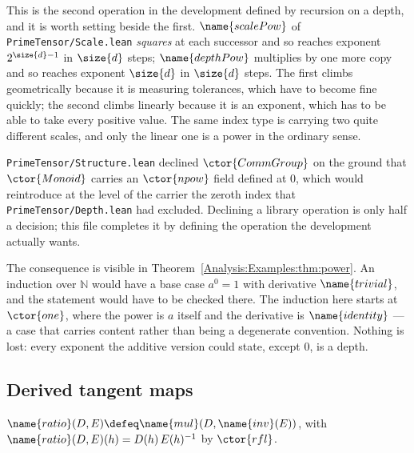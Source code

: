 \begin{remark}
\label{Analysis:Examples:rem:two-iterations}
This is the second operation in the development defined by recursion on a
depth, and it is worth setting beside the first.  $\name{scalePow}$ of
\texttt{PrimeTensor/Scale.lean} \emph{squares} at each successor and so reaches
exponent $2^{\size{d}-1}$ in $\size{d}$ steps; $\name{depthPow}$ multiplies by
one more copy and so reaches exponent $\size{d}$ in $\size{d}$ steps.  The
first climbs geometrically because it is measuring tolerances, which have to
become fine quickly; the second climbs linearly because it is an exponent,
which has to be able to take every positive value.  The same index type is
carrying two quite different scales, and only the linear one is a power in the
ordinary sense.
\end{remark}

\begin{designnote}
\label{Analysis:Examples:note:no-zero}
\texttt{PrimeTensor/Structure.lean} declined $\ctor{CommGroup}$ on the ground
that $\ctor{Monoid}$ carries an $\ctor{npow}$ field defined at $0$, which would
reintroduce at the level of the carrier the zeroth index that
\texttt{PrimeTensor/Depth.lean} had excluded.  Declining a library operation is
only half a decision; this file completes it by defining the operation the
development actually wants.

The consequence is visible in Theorem~\ref{Analysis:Examples:thm:power}.  An
induction over $\mathbb{N}$ would have a base case $a^{0} = 1$ with derivative
$\name{trivial}$, and the statement would have to be checked there.  The
induction here starts at $\ctor{one}$, where the power is $a$ itself and the
derivative is $\name{identity}$ --- a case that carries content rather than
being a degenerate convention.  Nothing is lost: every exponent the additive
version could state, except $0$, is a depth.
\end{designnote}

\subsection{Derived tangent maps}

\begin{definition}\label{Analysis:Examples:def:tratio}
$\name{ratio}(D,E) \defeq \name{mul}(D, \name{inv}(E))$, with
$\name{ratio}(D,E)(h) = D(h)\,E(h)^{-1}$ by $\ctor{rfl}$.
\end{definition}

